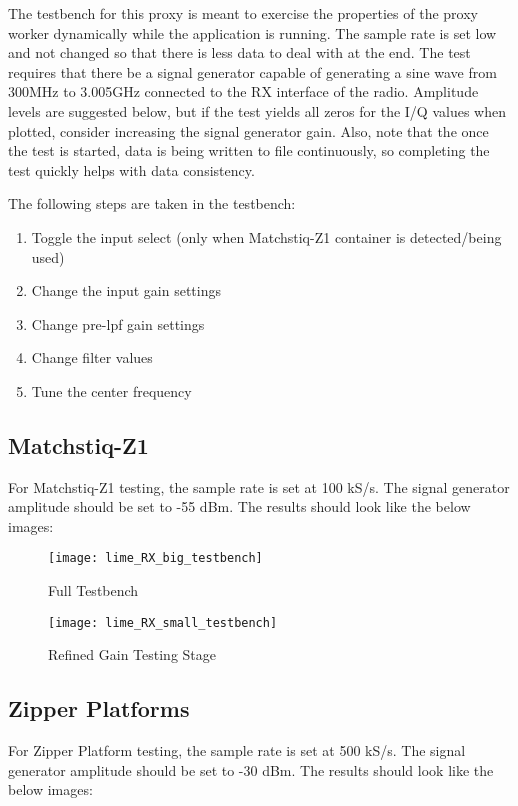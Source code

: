 The testbench for this proxy is meant to exercise the properties of the proxy worker dynamically while the application is running. The sample rate is set low and not changed so that there is less data to deal with at the end. The test requires that there be a signal generator capable of generating a sine wave from 300MHz to 3.005GHz connected to the RX interface of the radio. Amplitude levels are suggested below, but if the test yields all zeros for the I/Q values when plotted, consider increasing the signal generator gain. Also, note that the once the test is started, data is being written to file continuously, so completing the test quickly helps with data consistency.\par\medskip
\noindent The following steps are taken in the testbench:
\begin{enumerate}
	\item Toggle the input select (only when Matchstiq-Z1 container is detected/being used)
	\item Change the input gain settings
	\item Change pre-lpf gain settings
	\item Change filter values
	\item Tune the center frequency
\end{enumerate}

\newpage
\subsection*{Matchstiq-Z1}
For Matchstiq-Z1 testing, the sample rate is set at 100 kS/s. The signal generator amplitude should be set to -55 dBm.
The results should look like the below images:
\begin{figure}[H]
	\centerline{\texttt{[image: lime\_RX\_big\_testbench]}}
	\caption{Full Testbench}
\end{figure}
\begin{figure}[H]
	\centerline{\texttt{[image: lime\_RX\_small\_testbench]}}
	\caption{Refined Gain Testing Stage}
\end{figure}

\newpage
\subsection*{Zipper Platforms}
For Zipper Platform testing, the sample rate is set at 500 kS/s. The signal generator amplitude should be set to -30 dBm. The results should look like the below images:

